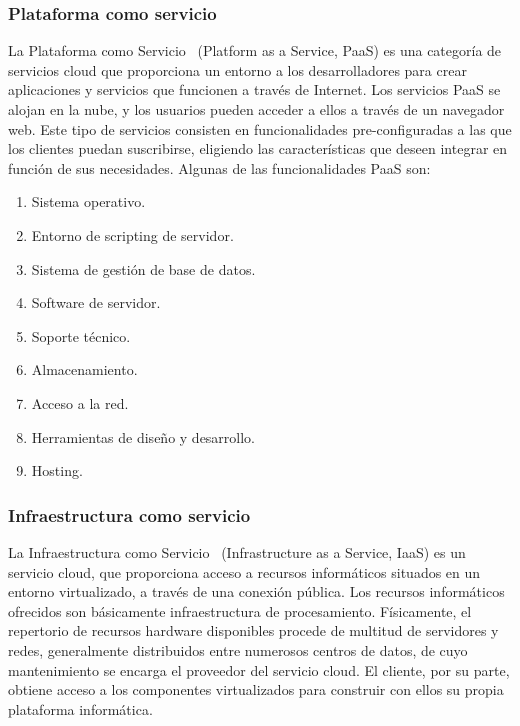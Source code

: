 \documentclass[a4paper,11pt]{book}
\begin{document}
\subsubsection{Plataforma como servicio}\label{secpaas}

La Plataforma como Servicio~\cite{paas} (Platform as a Service, PaaS) es una categoría de servicios cloud que proporciona un entorno a los desarrolladores para crear aplicaciones y servicios que funcionen a través de Internet. Los servicios PaaS se alojan en la nube, y los usuarios pueden acceder a ellos a través de un navegador web. Este tipo de servicios consisten en funcionalidades pre-configuradas a las que los clientes puedan suscribirse, eligiendo las características que deseen integrar en función de sus necesidades. Algunas de las funcionalidades PaaS son:

\begin{enumerate}
\item Sistema operativo.
\item Entorno de scripting de servidor.
\item Sistema de gestión de base de datos.
\item Software de servidor.
\item Soporte técnico.
\item Almacenamiento.
\item Acceso a la red.
\item Herramientas de diseño y desarrollo.
\item Hosting.
\end{enumerate}

\subsubsection{Infraestructura como servicio}

La Infraestructura como Servicio~\cite{iaas} (Infrastructure as a Service, IaaS) es un servicio cloud, que proporciona acceso a recursos informáticos situados en un entorno virtualizado, a través de una conexión pública. Los recursos informáticos ofrecidos  son básicamente infraestructura de procesamiento. Físicamente, el repertorio de recursos hardware disponibles procede de multitud de servidores y redes, generalmente distribuidos entre numerosos centros de datos, de cuyo mantenimiento se encarga el proveedor del servicio cloud. El cliente, por su parte, obtiene acceso a los componentes virtualizados para construir con ellos su propia plataforma informática.
\end{document}
